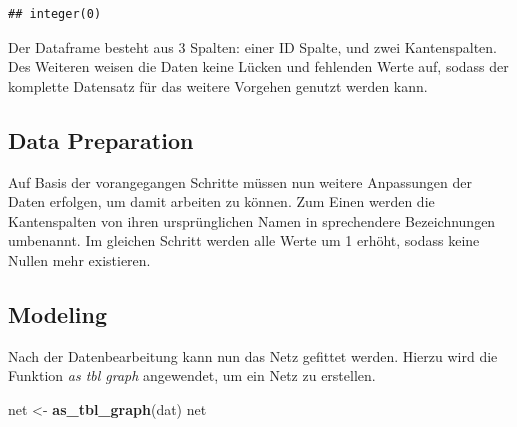 \documentclass[
  12 pt,
]{article}
\newenvironment{Shaded}{\begin{snugshade}}{\end{snugshade}}
\newcommand{\DataTypeTok}[1]{\textcolor[rgb]{0.13,0.29,0.53}{#1}}
\newcommand{\DecValTok}[1]{\textcolor[rgb]{0.00,0.00,0.81}{#1}}
\newcommand{\KeywordTok}[1]{\textcolor[rgb]{0.13,0.29,0.53}{\textbf{#1}}}
\newcommand{\NormalTok}[1]{#1}
\newcommand{\OperatorTok}[1]{\textcolor[rgb]{0.81,0.36,0.00}{\textbf{#1}}}
\newcommand{\StringTok}[1]{\textcolor[rgb]{0.31,0.60,0.02}{#1}}
\begin{document}
\begin{verbatim}
## integer(0)
\end{verbatim}

Der Dataframe besteht aus 3 Spalten: einer ID Spalte, und zwei
Kantenspalten. Des Weiteren weisen die Daten keine Lücken und fehlenden
Werte auf, sodass der komplette Datensatz für das weitere Vorgehen
genutzt werden kann.

\hypertarget{data-preparation}{%
\subsection{Data Preparation}\label{data-preparation}}

Auf Basis der vorangegangen Schritte müssen nun weitere Anpassungen der
Daten erfolgen, um damit arbeiten zu können. Zum Einen werden die
Kantenspalten von ihren ursprünglichen Namen in sprechendere
Bezeichnungen umbenannt. Im gleichen Schritt werden alle Werte um 1
erhöht, sodass keine Nullen mehr existieren.\\

\begin{Shaded}
\end{Shaded}

\hypertarget{modeling}{%
\subsection{Modeling}\label{modeling}}

Nach der Datenbearbeitung kann nun das Netz gefittet werden. Hierzu wird
die Funktion \textit{as tbl graph} angewendet, um ein Netz zu
erstellen.\\

\begin{Shaded}
\begin{Highlighting}[]
\NormalTok{net <-}\StringTok{ }\KeywordTok{as_tbl_graph}\NormalTok{(dat)}
\NormalTok{net}
\end{Highlighting}
\end{Shaded}
\end{document}
